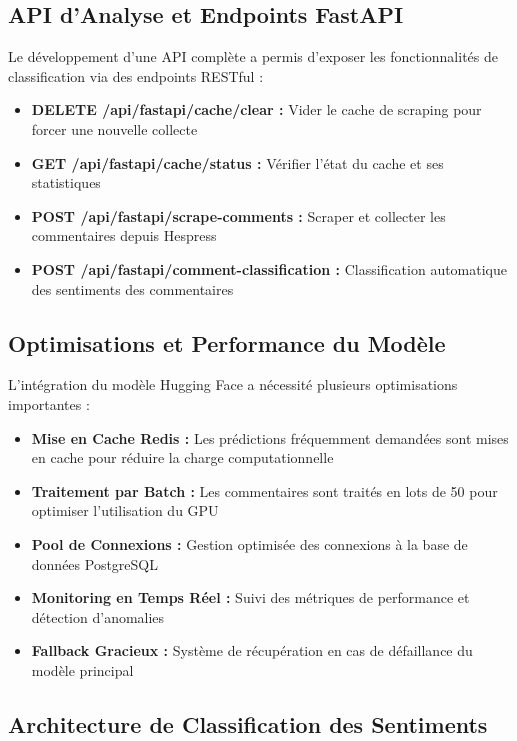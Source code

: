 \subsection{API d'Analyse et Endpoints FastAPI}

Le développement d'une API complète a permis d'exposer les fonctionnalités de classification via des endpoints RESTful :

\begin{itemize}
    \item \textbf{DELETE /api/fastapi/cache/clear :} Vider le cache de scraping pour forcer une nouvelle collecte
    \item \textbf{GET /api/fastapi/cache/status :} Vérifier l'état du cache et ses statistiques
    \item \textbf{POST /api/fastapi/scrape-comments :} Scraper et collecter les commentaires depuis Hespress
    \item \textbf{POST /api/fastapi/comment-classification :} Classification automatique des sentiments des commentaires
\end{itemize}

\subsection{Optimisations et Performance du Modèle}

L'intégration du modèle Hugging Face a nécessité plusieurs optimisations importantes :

\begin{itemize}
    \item \textbf{Mise en Cache Redis :} Les prédictions fréquemment demandées sont mises en cache pour réduire la charge computationnelle
    \item \textbf{Traitement par Batch :} Les commentaires sont traités en lots de 50 pour optimiser l'utilisation du GPU
    \item \textbf{Pool de Connexions :} Gestion optimisée des connexions à la base de données PostgreSQL
    \item \textbf{Monitoring en Temps Réel :} Suivi des métriques de performance et détection d'anomalies
    \item \textbf{Fallback Gracieux :} Système de récupération en cas de défaillance du modèle principal
\end{itemize}

\subsection{Architecture de Classification des Sentiments}

